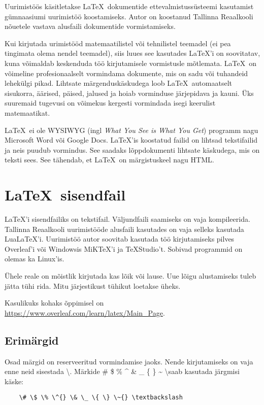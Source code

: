 \documentclass{trkut}%
\begin{document}
\maketitle%
\tableofcontents%

\nummerdame%

Uurimistöös käsitletakse \LaTeX \ dokumentide ettevalmistussüsteemi kasutamist gümnaasiumi uurimistöö koostamiseks. Autor on koostanud Tallinna Reaalkooli nõuetele vastava alusfaili dokumentide vormistamiseks.

Kui kirjutada urimistööd matemaatilistel või tehnilistel teemadel (ei pea tingimata olema nendel teemadel), siis luues see kasutades \LaTeX'i on soovitatav, kuna võimaldab keskenduda töö kirjutamisele vormistusle mõtlemata. \LaTeX \ on võimeline profesionaalselt vormindama dokumente, mis on sadu või tuhandeid lehekülgi pikad. Lihtsate märgenduskäskudega loob \LaTeX \ automaatselt sisukorra, äärised, päised, jalused ja hoiab vorminduse järjepidava ja kauni. Üks suuremaid tugevusi on võimekus kergesti vormindada isegi keerulist matemaatikat.

\LaTeX \ ei ole \textsc{WYSIWYG} (ingl \textit{What You See is What You Get}) programm nagu Microsoft Word või Google Docs. \LaTeX'is koostatud failid on lihtsad tekstifailid ja neis puudub vormindus. See saadaks lõppdokumenti lihtsate käskudega, mis on teksti sees. See tähendab, et \LaTeX \ on märgistuskeel nagu HTML.

\chapter{\LaTeX \ sisendfail}
\LaTeX'i sisendfailiks on tekstifail. Väljundfaili saamiseks on vaja kompileerida. Tallinna Reaalkooli uurimistööde alusfaili kasutades on vaja selleks kasutada LuaLaTeX'i. Uurimistöö autor soovitab kasutada töö kirjutamiseks pilves Overleaf'i või Windowsis MiKTeX'i ja TeXStudio't. Sobivad programmid on olemas ka Linux'is.

Ühele reale on mõistlik kirjutada kas lõik või lause. Uue lõigu alustamiseks tuleb jätta tühi rida. Mitu järjestikust tühikut loetakse üheks.

Kasulikuks kohaks õppimisel on \url{https://www.overleaf.com/learn/latex/Main_Page}.

\section{Erimärgid}
Osad märgid on reserveeritud vormindamise jaoks. Nende kirjutamiseks on vaja enne neid sisestada \textbackslash. Märkide \# \$ \% \^{} \& \_ \{ \} \~{} \textbackslash saab kasutada järgmisi käske:
\begin{verbatim}
    \# \$ \% \^{} \& \_ \{ \} \~{} \textbackslash
\end{verbatim}
\end{document}

